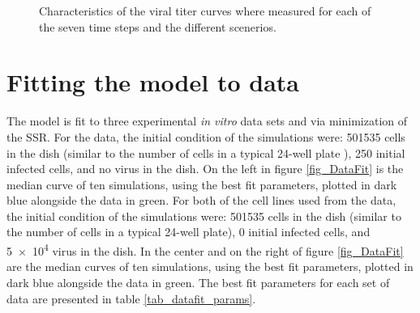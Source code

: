 \begin{figure}
\begin{minipage}{\linewidth}
{    }
\end{minipage}
\caption{Characteristics of the viral titer curves where measured for each of the seven time steps and the different scenerios.\label{fig_AspectGraphs}}
\end{figure}

\section{Fitting the model to data} \label{result_fit}

The model is fit to three experimental \emph{in vitro} data sets \citep{pinilla12} and \citep{wang_susceptibility_2021} via minimization of the SSR. For the \citep{pinilla12} data, the initial condition of the simulations were: 501535 cells in the dish (similar to the number of cells in a typical 24-well plate \citep{Number_of_cells_in_a_dish_noauthor_useful_nodate}), 250 initial infected cells, and no virus in the dish. On the left in figure \ref{fig_DataFit} is the median curve of ten simulations, using the best fit parameters, plotted in dark blue alongside the data in green. For both of the cell lines used from the \citep{wang_susceptibility_2021} data, the initial condition of the simulations were: 501535 cells in the dish (similar to the number of cells in a typical 24-well plate), 0 initial infected cells, and \num{5e4} virus in the dish. In the center and on the right of figure \ref{fig_DataFit} are the median curves of ten simulations, using the best fit parameters, plotted in dark blue alongside the data in green. The best fit parameters for each set of data are presented in table \ref{tab_datafit_params}.

